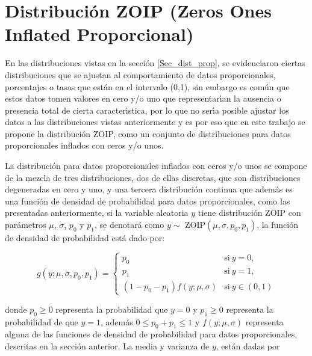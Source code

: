\section{Distribuci\'{o}n ZOIP (Zeros Ones Inflated Proporcional)}\label{Sec_dist_zoip}

En las distribuciones vistas en la secci\'{o}n \ref{Sec_dist_prop}, se evidenciaron ciertas distribuciones que se ajustan al comportamiento de datos proporcionales, porcentajes o tasas que est\'{a}n en el intervalo (0,1), sin embargo es com\'{u}n que estos datos tomen valores en cero y/o uno que representar\'{\i}an la ausencia o presencia total de cierta caracter\'{\i}stica, por lo que no ser\'{\i}a posible ajustar los datos a las distribuciones vistas anteriormente y es por eso que en este trabajo se propone la distribuci\'{o}n ZOIP, como un conjunto de distribuciones para datos proporcionales inflados con ceros y/o unos.

La distribuci\'{o}n para datos proporcionales inflados con ceros y/o unos se compone de la mezcla de tres distribuciones, dos de ellas discretas, que son distribuciones degeneradas en cero y uno, y una tercera distribuci\'{o}n continua que adem\'{a}s es una funci\'{o}n de densidad de probabilidad para datos proporcionales, como las presentadas anteriormente, si la variable aleatoria $y$ tiene distribuci\'{o}n ZOIP con par\'{a}metros $\mu$, $\sigma$, $p_0$ y $p_1$, se denotar\'{a} como $y \sim$ ZOIP$(\mu,\sigma, p_0, p_1)$, la funci\'{o}n de densidad de probabilidad est\'{a} dado por:

\begin{equation}
g(y;\mu,\sigma, p_{0}, p_{1})=
\begin{cases}
p_{0} & \text{si}\ y=0,\\
p_{1} & \text{si}\ y=1,\\
(1-p_{0}-p_{1})f(y;\mu,\sigma) & \text{si}\ y \in (0,1)
\end{cases}
 \label{eq_Dist_ZOIP}
\end{equation}

donde $p_{0} \geq 0$ representa la probabilidad que $y=0$ y $p_{1} \geq 0$ representa la probabilidad de que $y=1$, adem\'{a}s $0\leq p_{0}+p_{1}\leq 1$ y $f(y;\mu,\sigma)$ representa alguna de las funciones de densidad de probabilidad para datos proporcionales, descritas en la secci\'{o}n anterior. La media y varianza de $y$, est\'{a}n dadas por

